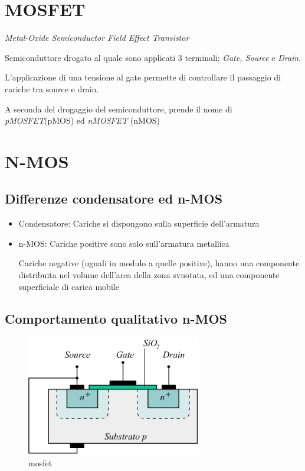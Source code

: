 \documentclass{article}
\begin{document}
\section{MOSFET}
\textit{Metal-Oxide Semiconductor Field Effect Transistor}

Semiconduttore drogato al quale sono applicati 3 terminali: \textit{Gate, Source} e \textit{Drain}.

L'applicazione di una tensione al gate permette di controllare il passaggio di cariche tra source e drain.

A seconda del drogaggio del semiconduttore, prende il nome di \textit{pMOSFET}(pMOS) ed \textit{nMOSFET} (nMOS)

\section{N-MOS}


\subsection{Differenze condensatore ed n-MOS}
\begin{itemize}
    \item Condensatore:
        Cariche si dispongono sulla superficie dell'armatura
    \item n-MOS:
        Cariche positive sono solo sull'armatura metallica

        Cariche negative (uguali in modulo a quelle positive), hanno una componente distribuita nel volume dell'area della zona svuotata, ed una componente superficiale di carica mobile
\end{itemize}

\subsection{Comportamento qualitativo n-MOS}

\begin{figure}[h]
    \includegraphics[width=3in]{mosfet}
    \centering
    \caption{mosfet}
\end{figure}
\end{document}
